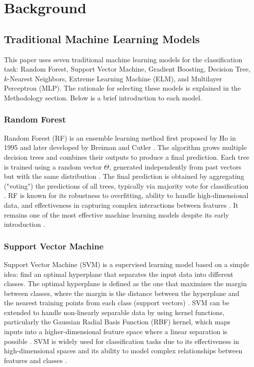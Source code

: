 \section{Background}
\subsection{Traditional Machine Learning Models}

This paper uses seven traditional machine learning models for the classification task: Random Forest, Support Vector Machine, Gradient Boosting, Decision Tree, $k$-Nearest Neighbors, Extreme Learning Machine (ELM), and Multilayer Perceptron (MLP). The rationale for selecting these models is explained in the Methodology section. Below is a brief introduction to each model.

\subsubsection{Random Forest}

Random Forest (RF) is an ensemble learning method first proposed by Ho in 1995 \cite{Ho1995} and later developed by Breiman and Cutler \cite{Breiman2001}. The algorithm grows multiple decision trees and combines their outputs to produce a final prediction. Each tree is trained using a random vector $\Theta$, generated independently from past vectors but with the same distribution \cite{Breiman2001}. The final prediction is obtained by aggregating ("voting") the predictions of all trees, typically via majority vote for classification \cite{Breiman2001}. RF is known for its robustness to overfitting, ability to handle high-dimensional data, and effectiveness in capturing complex interactions between features \cite{Breiman2001}. It remains one of the most effective machine learning models despite its early introduction \cite{Delgado2014}.

\subsubsection{Support Vector Machine}

Support Vector Machine (SVM) is a supervised learning model based on a simple idea: find an optimal hyperplane that separates the input data into different classes. The optimal hyperplane is defined as the one that maximizes the margin between classes, where the margin is the distance between the hyperplane and the nearest training points from each class (support vectors) \cite{Cortes1995}. SVM can be extended to handle non-linearly separable data by using kernel functions, particularly the Gaussian Radial Basis Function (RBF) kernel, which maps inputs into a higher-dimensional feature space where a linear separation is possible \cite{Schoelkopf2002}. SVM is widely used for classification tasks due to its effectiveness in high-dimensional spaces and its ability to model complex relationships between features and classes \cite{Hsu2003}.

